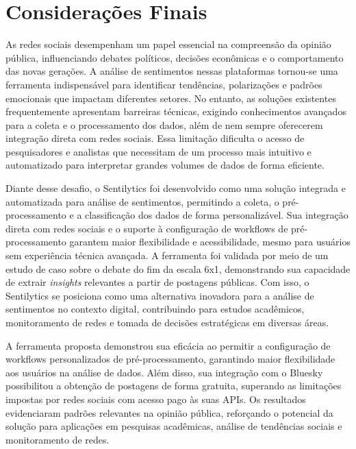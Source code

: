 \documentclass[
	12pt,				%
	oneside,			%
	a4paper,			%
	english,			%
	french,				%
	spanish,			%
	brazil				%
	]{abntex2}
\begin{document}
\hypertarget{considerauxe7uxf5es-finais}{%
\chapter{Considerações Finais}\label{considerauxe7uxf5es-finais}}

As redes sociais desempenham um papel essencial na compreensão da
opinião pública, influenciando debates políticos, decisões econômicas e
o comportamento das novas gerações. A análise de sentimentos nessas
plataformas tornou-se uma ferramenta indispensável para identificar
tendências, polarizações e padrões emocionais que impactam diferentes
setores. No entanto, as soluções existentes frequentemente apresentam
barreiras técnicas, exigindo conhecimentos avançados para a coleta e o
processamento dos dados, além de nem sempre oferecerem integração direta
com redes sociais. Essa limitação dificulta o acesso de pesquisadores e
analistas que necessitam de um processo mais intuitivo e automatizado
para interpretar grandes volumes de dados de forma eficiente.

Diante desse desafio, o Sentilytics foi desenvolvido como uma solução
integrada e automatizada para análise de sentimentos, permitindo a
coleta, o pré-processamento e a classificação dos dados de forma
personalizável. Sua integração direta com redes sociais e o suporte à
configuração de workflows de pré-processamento garantem maior
flexibilidade e acessibilidade, mesmo para usuários sem experiência
técnica avançada. A ferramenta foi validada por meio de um estudo de
caso sobre o debate do fim da escala 6x1, demonstrando sua capacidade de
extrair \emph{insights} relevantes a partir de postagens públicas. Com
isso, o Sentilytics se posiciona como uma alternativa inovadora para a
análise de sentimentos no contexto digital, contribuindo para estudos
acadêmicos, monitoramento de redes e tomada de decisões estratégicas em
diversas áreas.

A ferramenta proposta demonstrou sua eficácia ao permitir a configuração
de workflows personalizados de pré-processamento, garantindo maior
flexibilidade aos usuários na análise de dados. Além disso, sua
integração com o Bluesky possibilitou a obtenção de postagens de forma
gratuita, superando as limitações impostas por redes sociais com acesso
pago às suas APIs. Os resultados evidenciaram padrões relevantes na
opinião pública, reforçando o potencial da solução para aplicações em
pesquisas acadêmicas, análise de tendências sociais e monitoramento de
redes.
\end{document}
